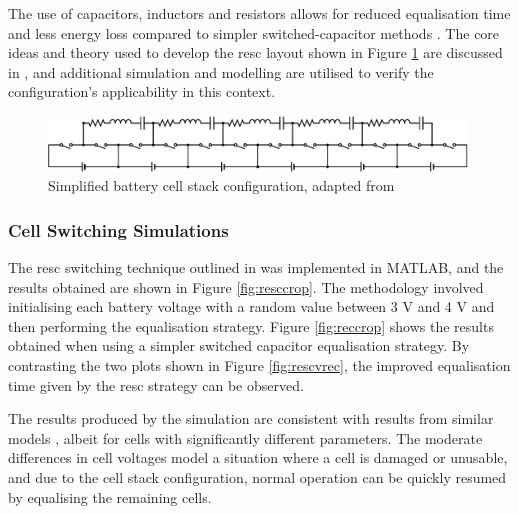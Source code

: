 The use of capacitors, inductors and resistors allows for reduced equalisation time and less energy loss compared to simpler switched-capacitor methods \cite{8467638}. The core ideas and theory used to develop the \gls{resc} layout shown in Figure \ref{fig:bcs} are discussed in \cite{8681672}, and additional simulation and modelling are utilised to verify the configuration's applicability in this context.

\begin{figure}[H]
\centering
\vspace{10mm}
\includegraphics[width=0.99\textwidth]{figs/Samuel/Figures/resc1-cropped.pdf}
\caption[Simplified Battery Cell Stack Configuration]{Simplified battery cell stack configuration, adapted from \cite{8467638}}
\label{fig:bcs}
\end{figure}

\subsubsection{Cell Switching Simulations}
\label{swit}

The \gls{resc} switching technique outlined in \cite{8467638} was implemented in MATLAB, and the results obtained are shown in Figure \ref{fig:resccrop}. The methodology involved initialising each battery voltage with a random value between 3 V and 4 V and then performing the equalisation strategy. Figure \ref{fig:reccrop} shows the results obtained when using a simpler switched capacitor equalisation strategy. By contrasting the two plots shown in Figure \ref{fig:rescvrec}, the improved equalisation time given by the \gls{resc} strategy can be observed. 

The results produced by the simulation are consistent with results from similar models \cite{8467638}, albeit for cells with significantly different parameters. The moderate differences in cell voltages model a situation where a cell is damaged or unusable, and due to the cell stack configuration, normal operation can be quickly resumed by equalising the remaining cells.

